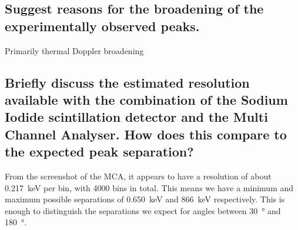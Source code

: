 \documentclass[a4paper]{scrartcl}
\begin{document}
\subsection{Suggest reasons for the broadening of the experimentally observed peaks.}
Primarily thermal Doppler broadening

\subsection{Briefly discuss the estimated resolution available with the combination of the Sodium Iodide scintillation detector and the Multi Channel Analyser. How does this compare to the expected peak separation?}
From the screenshot of the MCA, it appears to have a resolution of about \SI{0.217}{\kilo\electronvolt} per bin, with 4000 bins in total. This means we have a minimum and maximum possible separations of \SI{0.650}{\kilo\electronvolt} and \SI{866}{\kilo\electronvolt} respectively. This is enough to distinguish the separations we expect for angles between \SI{30}{\degree} and \SI{180}{\degree}.
\end{document}
